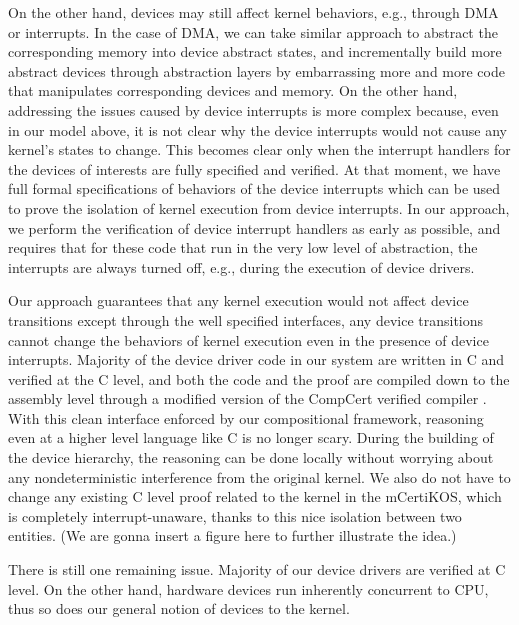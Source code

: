 {On the other hand, devices may still affect kernel behaviors, e.g., through
DMA or interrupts. In the case of DMA, we can take similar approach to
abstract the corresponding memory into device abstract states, and incrementally
build more abstract devices through abstraction layers by embarrassing
more and more code that manipulates corresponding devices and memory.
On the other hand,
addressing the issues caused by device interrupts is more complex because,
even in our model above, it is not clear why the device interrupts would
not cause any kernel's states to change. This becomes clear only when 
the interrupt handlers for the devices of interests are fully specified
and verified. At that moment, we have full formal specifications of
behaviors of the device interrupts which can be used to prove the isolation
of kernel execution from device interrupts. In our approach, we perform the
verification of device interrupt handlers as early as possible, and
requires that for these code that run in the very low level of abstraction,
the interrupts are always turned off, e.g., during the execution of device drivers.

Our approach guarantees that any kernel execution would not affect device
transitions except through the well specified interfaces, any device transitions
cannot change the behaviors of kernel execution even in the presence of device
interrupts. Majority of the device driver code in our system are written in C
and verified at the C level, and both the code and the proof are compiled down
to the assembly level through a modified version of the CompCert verified
compiler \cite{dscal15}. With this clean interface enforced by our compositional
framework, reasoning even at a higher level language like C is no longer scary.
During the building of the device hierarchy, the reasoning can be done locally
without worrying about any nondeterministic interference from the original
kernel. We also do not have to change any existing C level proof related to the
kernel in the mCertiKOS, which is completely interrupt-unaware, thanks to this
nice isolation between two entities. (We are gonna insert a figure here to
further illustrate the idea.)

There is still one remaining issue. Majority of our device drivers
are verified at C level. On the other hand, hardware devices run
inherently concurrent to CPU, thus so does our general notion of devices to
the kernel. 

}

